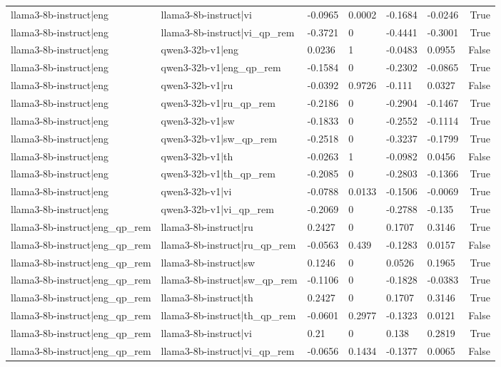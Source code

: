 \begin{table}
\begin{tabular}{llllllr}
llama3-8b-instruct|eng & llama3-8b-instruct|vi & -0.0965 & 0.0002 & -0.1684 & -0.0246 & True \\
llama3-8b-instruct|eng & llama3-8b-instruct|vi_qp_rem & -0.3721 & 0 & -0.4441 & -0.3001 & True \\
llama3-8b-instruct|eng & qwen3-32b-v1|eng & 0.0236 & 1 & -0.0483 & 0.0955 & False \\
llama3-8b-instruct|eng & qwen3-32b-v1|eng_qp_rem & -0.1584 & 0 & -0.2302 & -0.0865 & True \\
llama3-8b-instruct|eng & qwen3-32b-v1|ru & -0.0392 & 0.9726 & -0.111 & 0.0327 & False \\
llama3-8b-instruct|eng & qwen3-32b-v1|ru_qp_rem & -0.2186 & 0 & -0.2904 & -0.1467 & True \\
llama3-8b-instruct|eng & qwen3-32b-v1|sw & -0.1833 & 0 & -0.2552 & -0.1114 & True \\
llama3-8b-instruct|eng & qwen3-32b-v1|sw_qp_rem & -0.2518 & 0 & -0.3237 & -0.1799 & True \\
llama3-8b-instruct|eng & qwen3-32b-v1|th & -0.0263 & 1 & -0.0982 & 0.0456 & False \\
llama3-8b-instruct|eng & qwen3-32b-v1|th_qp_rem & -0.2085 & 0 & -0.2803 & -0.1366 & True \\
llama3-8b-instruct|eng & qwen3-32b-v1|vi & -0.0788 & 0.0133 & -0.1506 & -0.0069 & True \\
llama3-8b-instruct|eng & qwen3-32b-v1|vi_qp_rem & -0.2069 & 0 & -0.2788 & -0.135 & True \\
llama3-8b-instruct|eng_qp_rem & llama3-8b-instruct|ru & 0.2427 & 0 & 0.1707 & 0.3146 & True \\
llama3-8b-instruct|eng_qp_rem & llama3-8b-instruct|ru_qp_rem & -0.0563 & 0.439 & -0.1283 & 0.0157 & False \\
llama3-8b-instruct|eng_qp_rem & llama3-8b-instruct|sw & 0.1246 & 0 & 0.0526 & 0.1965 & True \\
llama3-8b-instruct|eng_qp_rem & llama3-8b-instruct|sw_qp_rem & -0.1106 & 0 & -0.1828 & -0.0383 & True \\
llama3-8b-instruct|eng_qp_rem & llama3-8b-instruct|th & 0.2427 & 0 & 0.1707 & 0.3146 & True \\
llama3-8b-instruct|eng_qp_rem & llama3-8b-instruct|th_qp_rem & -0.0601 & 0.2977 & -0.1323 & 0.0121 & False \\
llama3-8b-instruct|eng_qp_rem & llama3-8b-instruct|vi & 0.21 & 0 & 0.138 & 0.2819 & True \\
llama3-8b-instruct|eng_qp_rem & llama3-8b-instruct|vi_qp_rem & -0.0656 & 0.1434 & -0.1377 & 0.0065 & False \\

\end{tabular}
\end{table}

